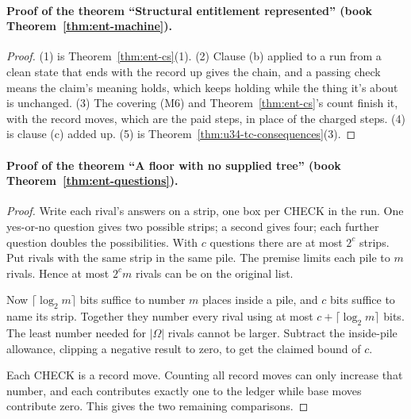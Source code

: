 \documentclass[11pt,twoside]{article}
\theoremstyle{thielethm}
\theoremstyle{thieledef}
\theoremstyle{thieledef}
\theoremstyle{thieledef}
\theoremstyle{thielethm}
\theoremstyle{thieleobs}
\theoremstyle{thielethm}
\begin{document}
\paragraph{Proof of the theorem ``Structural entitlement represented'' (book Theorem~\ref{thm:ent-machine}).}
\begin{proof}
(1) is Theorem~\ref{thm:ent-cs}(1). (2) Clause (b) applied to a run from a clean state that ends
with the record up gives the chain, and a passing check means the claim's meaning holds, which
keeps holding while the thing it's about is unchanged. (3) The covering (M6) and
Theorem~\ref{thm:ent-cs}'s count finish it, with
the record moves, which are the paid steps, in place of the charged steps. (4) is clause (c)
added up. (5) is Theorem~\ref{thm:u34-tc-consequences}(3).
\end{proof}

\paragraph{Proof of the theorem ``A floor with no supplied tree'' (book Theorem~\ref{thm:ent-questions}).}
\begin{proof}
Write each rival's answers on a strip, one box per CHECK in the run.
One yes-or-no question gives two possible strips; a second gives four;
each further question doubles the possibilities. With $c$ questions there
are at most $2^c$ strips. Put rivals with the same strip in the same pile.
The premise limits each pile to $m$ rivals. Hence at most $2^c m$ rivals
can be on the original list.

Now $\lceil\log_2 m\rceil$ bits suffice to number $m$ places inside a pile,
and $c$ bits suffice to name its strip. Together they number every rival
using at most $c+\lceil\log_2 m\rceil$ bits. The least number needed for
$|\Omega|$ rivals cannot be larger. Subtract the inside-pile allowance,
clipping a negative result to zero, to get the claimed bound of $c$.

Each CHECK is a record move. Counting all record moves can only increase
that number, and each contributes exactly one to the ledger while base
moves contribute zero. This gives the two remaining comparisons.
\end{proof}
\end{document}

